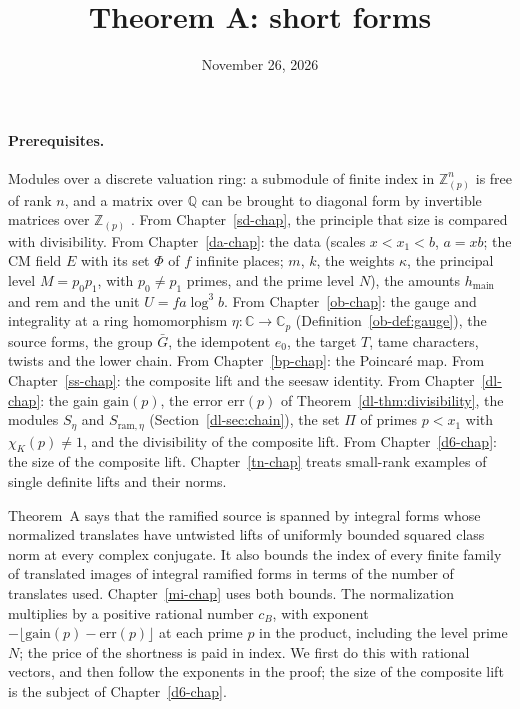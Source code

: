 \documentclass[reqno]{amsart}
\title{Theorem A: short forms}
\author{}
\date{November 26, 2026}
\newcounter{chap}
\theoremstyle{definition}
\theoremstyle{plain}
\theoremstyle{definition}
\newcommand{\Z}{\mathbb{Z}}
\newcommand{\Q}{\mathbb{Q}}
\newcommand{\C}{\mathbb{C}}
\newcommand{\Zp}{\Z_{(p)}}
\newcommand{\gain}{\mathrm{gain}}
\newcommand{\err}{\mathrm{err}}
\newcommand{\rem}{\mathrm{rem}}
\newcommand{\hm}{h_{\mathrm{main}}}
\newcommand{\Gb}{\bar G}
\begin{document}
\maketitle
{}\label{chap}

\paragraph{Prerequisites.}
Modules over a discrete valuation ring: a submodule of finite index in \(\Zp^n\) is free of rank \(n\), and a matrix over \(\Q\) can be brought to diagonal form by invertible matrices over \(\Zp\) \cite[Ch.~III, \S7]{La}.  From Chapter~\ref{sd-chap}, the principle that size is compared with divisibility.  From Chapter~\ref{da-chap}: the data (scales \(x < x_1 < b\), \(a = xb\); the CM field \(E\) with its set \(\Phi\) of \(f\) infinite places; \(m\), \(k\), the weights \(\kappa\), the principal level \(M = p_0p_1\), with \(p_0 \ne p_1\) primes, and the prime level \(N\)), the amounts \(\hm\) and \(\rem\) and the unit \(U = fa\log^3 b\).  From Chapter~\ref{ob-chap}: the gauge and integrality at a ring homomorphism \(\eta\colon \C \to \C_p\) (Definition~\ref{ob-def:gauge}), the source forms, the group \(\Gb\), the idempotent \(e_0\), the target \(T\), tame characters, twists and the lower chain.  From Chapter~\ref{bp-chap}: the Poincar\'e map.  From Chapter~\ref{ss-chap}: the composite lift and the seesaw identity.  From Chapter~\ref{dl-chap}: the gain \(\gain(p)\), the error \(\err(p)\) of Theorem~\ref{dl-thm:divisibility}, the modules \(S_\eta\) and \(S_{\mathrm{ram},\eta}\) (Section~\ref{dl-sec:chain}), the set \(\Pi\) of primes \(p < x_1\) with \(\chi_K(p) \ne 1\), and the divisibility of the composite lift.  From Chapter~\ref{d6-chap}: the size of the composite lift.  Chapter~\ref{tn-chap} treats small-rank examples of single definite lifts and their norms.

Theorem~A says that the ramified source is spanned by integral forms whose normalized translates have untwisted lifts of uniformly bounded squared class norm at every complex conjugate.  It also bounds the index of every finite family of translated images of integral ramified forms in terms of the number of translates used.  Chapter~\ref{mi-chap} uses both bounds.  The normalization multiplies by a positive rational number \(c_B\), with exponent \(-\lfloor\gain(p)-\err(p)\rfloor\) at each prime \(p\) in the product, including the level prime \(N\); the price of the shortness is paid in index.  We first do this with rational vectors, and then follow the exponents in the proof; the size of the composite lift is the subject of Chapter~\ref{d6-chap}.
\end{document}

